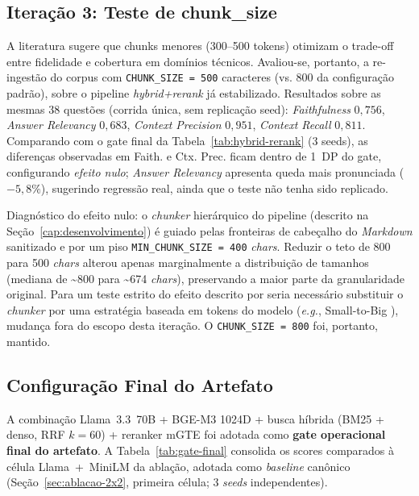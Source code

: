 \documentclass[
  12pt,
  oneside,
  a4paper,
  english,
  brazil
]{abntex2}
\begin{document}
\subsection{Iteração 3: Teste de chunk\_size}
\label{sec:chunk-test}

A literatura \cite{wang2024bestpractices} sugere que chunks menores
(300--500 tokens) otimizam o trade-off entre fidelidade e cobertura
em domínios técnicos. Avaliou-se, portanto, a re-ingestão do corpus com
\texttt{CHUNK\_SIZE = 500} caracteres (vs. 800 da configuração padrão), sobre
o pipeline \textit{hybrid+rerank} já estabilizado. Resultados sobre
as mesmas 38 questões (corrida única, sem replicação seed): \textit{Faithfulness}
$0{,}756$, \textit{Answer Relevancy} $0{,}683$, \textit{Context Precision}
$0{,}951$, \textit{Context Recall} $0{,}811$. Comparando com o gate final
da Tabela~\ref{tab:hybrid-rerank} (3 seeds), as diferenças observadas em
Faith. e Ctx. Prec. ficam dentro de 1~DP do gate, configurando \textit{efeito
nulo}; \textit{Answer Relevancy} apresenta queda mais pronunciada ($-5{,}8\%$),
sugerindo regressão real, ainda que o teste não tenha sido replicado.

Diagnóstico do efeito nulo: o \textit{chunker} hierárquico do
pipeline (descrito na Seção~\ref{cap:desenvolvimento}) é guiado
pelas fronteiras de cabeçalho do \textit{Markdown} sanitizado e por um piso
\texttt{MIN\_CHUNK\_SIZE = 400} \textit{chars}. Reduzir o teto de 800 para
500 \textit{chars} alterou apenas marginalmente a distribuição de tamanhos
(mediana de \textasciitilde{}800 para \textasciitilde{}674 \textit{chars}),
preservando a maior parte da granularidade original. Para um teste estrito
do efeito descrito por \citeauthor{wang2024bestpractices} seria necessário
substituir o \textit{chunker} por uma estratégia baseada em tokens
do modelo (\textit{e.g.}, Small-to-Big \cite{advancedChunkingRAG2025}),
mudança fora do escopo desta iteração. O \texttt{CHUNK\_SIZE = 800} foi,
portanto, mantido.

\subsection{Configuração Final do Artefato}
\label{sec:gate-final}

A combinação Llama~3.3~70B + BGE-M3 1024D + busca híbrida (BM25 + denso, RRF
$k = 60$) + reranker mGTE foi adotada como \textbf{gate operacional
final do artefato}. A Tabela~\ref{tab:gate-final} consolida os
scores comparados à célula Llama~+~MiniLM da ablação, adotada
como \textit{baseline} canônico (Seção~\ref{sec:ablacao-2x2}, primeira
célula; 3 \emph{seeds} independentes).
\end{document}
